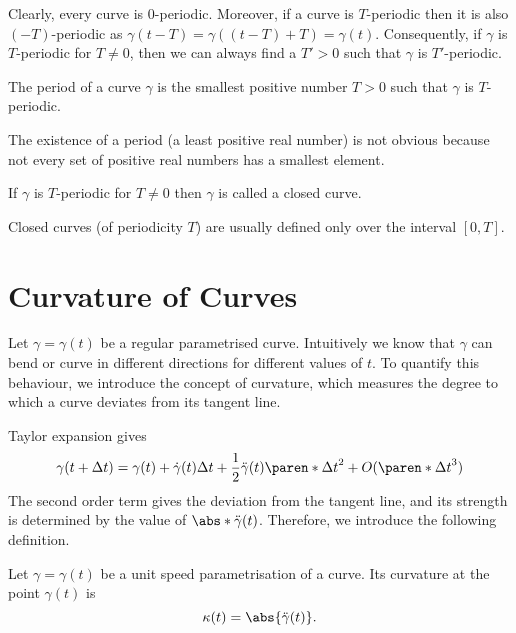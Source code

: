 \documentclass[11pt]{penrose}
\newcommand{\keyword}[1]{\textsf{#1}}
\begin{document}
Clearly, every curve is $0$-periodic. Moreover, if a curve is $T$-periodic then it is also $(-T)$-periodic as $\gamma(t - T) = \gamma((t-T) + T) = \gamma(t)$. Consequently, if $\gamma$ is $T$-periodic for $T \neq 0$, then we can always find a $T' > 0$ such that $\gamma$ is $T'$-periodic.

\begin{ndfn}
    The \keyword{period} of a curve $\gamma$ is the smallest positive number $T > 0$ such that $\gamma$ is $T$-periodic.
\end{ndfn}

The existence of a period (a least positive real number) is not obvious because not every set of positive real numbers has a smallest element.

\begin{ndfn}
    If $\gamma$ is $T$-periodic for $T \neq 0$ then $\gamma$ is called a \keyword{closed curve}.
\end{ndfn}

Closed curves (of periodicity $T$) are usually defined only over the interval $[0, T]$.

\section{Curvature of Curves}
Let $\gamma = \gamma(t)$ be a regular parametrised curve. Intuitively we know that $\gamma$ can bend or curve in different directions for different values of $t$. To quantify this behaviour, we introduce the concept of \keyword{curvature}, which measures the degree to which a curve deviates from its tangent line.

Taylor expansion gives
\begin{equation}
    \gamma(t + \Delta t) = \gamma(t) + \dot{\gamma}(t) \Delta t + \frac{1}{2} \ddot{\gamma}(t) \paren*{\Delta t}^2 + O(\paren*{\Delta t}^3)
\end{equation}
The second order term gives the deviation from the tangent line, and its strength is determined by the value of $\abs*{\ddot{\gamma}(t)}$. Therefore, we introduce the following definition.

\begin{ndfn}
    Let $\gamma = \gamma(t)$ be a unit speed parametrisation of a curve. Its \keyword{curvature} at the point $\gamma(t)$ is
    \begin{equation}
        \kappa(t) = \abs{\ddot{\gamma}(t)}.
        \label{eq:curvature-dfn}
    \end{equation}
\end{ndfn}
\end{document}
